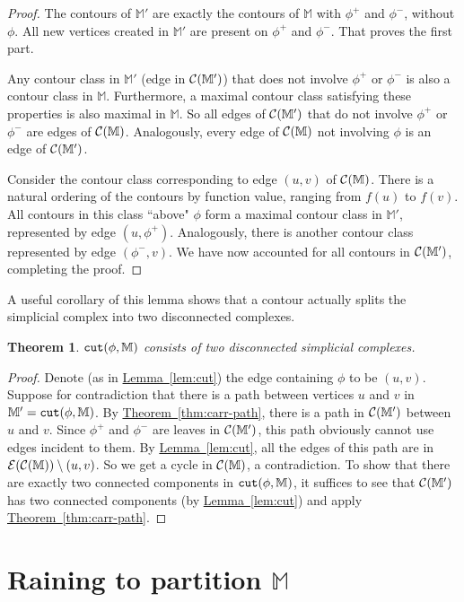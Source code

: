\documentclass[11pt]{article}
\newtheorem{theorem}{Theorem}
\theoremstyle{definition}
\newcommand{\cC}{{\cal C}}
\newcommand{\cE}{{\cal E}}
\newcommand{\MM}{\mathbb{M}}
\newcommand{\Thm}[1]{\hyperref[thm:#1]{Theorem~\ref*{thm:#1}}} %
\newcommand{\Lem}[1]{\hyperref[lem:#1]{Lemma~\ref*{lem:#1}}} %
\newcommand{\cut}{{\tt cut}}
\begin{document}
\begin{proof} The contours of $\MM'$ are exactly the contours of $\MM$ with $\phi^+$ and $\phi^-$, without $\phi$.
All new vertices created in $\MM'$ are present on $\phi^+$ and $\phi^-$. That proves the first part.

Any contour class in $\MM'$ (edge in $\cC(\MM')$) that does not involve $\phi^+$ or $\phi^-$ is also
a contour class in $\MM$. Furthermore, a maximal contour class satisfying these properties is also
maximal in $\MM$. So all edges of $\cC(\MM')$ that do not involve $\phi^+$ or $\phi^-$ are edges of $\cC(\MM)$.
Analogously, every edge of $\cC(\MM)$ not involving $\phi$ is an edge of $\cC(\MM')$.

Consider the contour class corresponding to edge $(u,v)$ of $\cC(\MM)$. There is a natural ordering
of the contours by function value, ranging from $f(u)$ to $f(v)$. All contours in this class ``above" $\phi$
form a maximal contour class in $\MM'$, represented by edge $(u,\phi^+)$. Analogously, there is another
contour class represented by edge $(\phi^-,v)$. We have now accounted for all contours in $\cC(\MM')$,
completing the proof.
\end{proof}

A useful corollary of this lemma shows that a contour actually splits the simplicial complex into
two disconnected complexes.

\begin{theorem} \label{thm:jordan} $\cut(\phi,\MM)$ consists of two
disconnected simplicial complexes.
\end{theorem}

\begin{proof} Denote (as in \Lem{cut}) the edge containing $\phi$ to be $(u,v)$. Suppose for contradiction that there is a path between vertices $u$ and $v$
in $\MM' = \cut(\phi,\MM)$. By \Thm{carr-path}, there is a path in $\cC(\MM')$ between $u$ and $v$. Since $\phi^+$ and $\phi^-$
are leaves in $\cC(\MM')$, this path obviously cannot use edges incident to them. By \Lem{cut},
all the edges of this path are in $\cE(\cC(\MM)) \setminus (u,v)$. So we get a cycle in $\cC(\MM)$, a contradiction.
To show that there are exactly two connected components in $\cut(\phi,\MM)$, it suffices
to see that $\cC(\MM')$ has two connected components (by \Lem{cut}) and apply \Thm{carr-path}.
\end{proof}

\section{Raining to partition $\MM$} \label{sec:rain}
\end{document}

